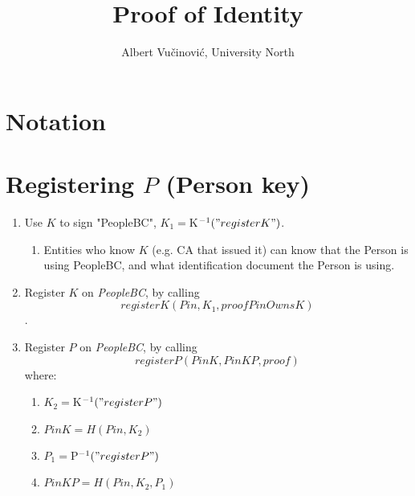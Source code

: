 \documentclass{article}
\title{Proof of Identity}
\author{Albert Vučinović, University North}
\newcommand{\khk}{$P$}
\newcommand{\kid}{$K$}
\newcommand{\pbc}{\textit{PeopleBC}}
\begin{document}
\maketitle
\section{Notation}

\newpage
\section{Registering \khk{} (Person key)}
\begin{enumerate}
  \item Use \kid{} to sign "PeopleBC", $K_1 = \kid^{-1}("registerK")$.
  \begin{enumerate}
    \item Entities who know \kid{} (e.g. CA that issued it) can know that the Person is using PeopleBC, and what identification document the Person is using.
  \end{enumerate}
  \item Register \kid{} on \pbc, by calling 
    $$registerK(Pin, K_1, proofPinOwnsK)$$.
  \item Register \khk{} on \pbc, by calling 
    $$registerP(PinK, PinKP, proof)$$
  where:
    \begin{enumerate}
      \item $K_2=\kid^{-1}("registerP")$
      \item $PinK=H(Pin,K_2)$
      \item $P_1 = \khk^{-1}("registerP")$
      \item $PinKP=H(Pin, K_2, P_1)$
    \end{enumerate}
\end{enumerate}

\newpage
\end{document}

